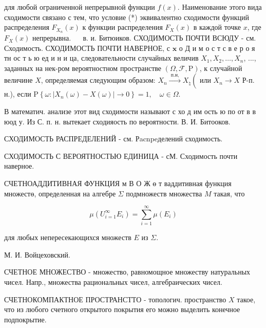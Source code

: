 \documentclass[10pt]{article}
\begin{document}
для любой ограниченной непрерывной функции $f(x)$. Наименование этого вида сходимости связано с тем, что условие (*) эквивалентно сходимости функций распределения $F_{X_{n}}(x)$ к функции распределения $F_{X}(x)$ в каждой точке $x$, где $F_{X}(x)$ непрерывна. $\quad$ в. и. Битюиков. СХОДИМОСТЬ ПОЧТИ ВСЮДУ - см. Сходимость. СХОДИМОСТЬ ПОЧТИ НАВЕРНОЕ, с $\mathbf{x}$ о Д и м о с т с в е р о я тн ос т ь ю ед и н и ца, следовательности случайных величив $X_{1}, X_{2}, \ldots, X_{n}$, ..., заданных на нек-ром вероятностном пространстве $(\Omega, \mathscr{F}, \mathrm{P})$, к случайной величине $X$, определяемая следующим образом: $X_{n} \stackrel{\text { п.н, }}{\rightarrow} X_{\natural}\left(\right.$ или $X_{n} \rightarrow X$ Р-п. н.), если $\mathrm{P}\left\{\omega:\left|X_{n}(\omega)-X(\omega)\right| \longrightarrow 0\right\}=1, \quad \omega \in \Omega$.



В математич. анализе этот вид сходимости называют с хо д им ость ю по от в в юод у. Из С. п. н. вытекает сходияость по вероятности. В. И. Битооков.



СХОДИМОСТЬ РАСПРЕДЕЛЕНИЙ - см. Рacnpeделений сходимость.



СХОДИМОСТЬ С ВЕРОЯТНОСТЬЮ ЕДИНИЦА - сМ. Сходимость почти наверное.



СЧЕТНОАДДИТИВНАЯ ФУНКЦИЯ м В $О$ Ж $ө$ т ваддитивная функция множестө, определенная на алгебре $\Sigma$ подмножеств множества $M$ такая, что



\[

\mu\left(U_{i=1}^{\infty} E_{i}\right)=\sum_{i=1}^{\infty} \mu\left(E_{i}\right)

\]



для любых непересекающихся множеств $E$ из $\Sigma$.



М. И. Войцеховский.



СЧЕТНОЕ МНОЖЕСТВО - множество, равномощное множеству натуральных чисел. Напр., множества рациональных чисел, алгебраических чисел.



СЧЕТНОКОМПАКТНОЕ ПРОСТРАНСТТО - топологич. пространство $X$ такое, что из любого счетного открытого покрытия его можно выделить конечное подпокрытие.
\end{document}
